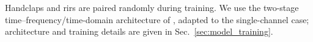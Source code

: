\documentclass{article}
\begin{document}
Handclaps and \acp{rir} are paired randomly during training.
We use the two-stage time--frequency/time-domain architecture of
\cite{moliner2026ambisonics}, adapted to the single-channel case; architecture
and training details are given in Sec.~\ref{sec:model_training}.








\end{document}
